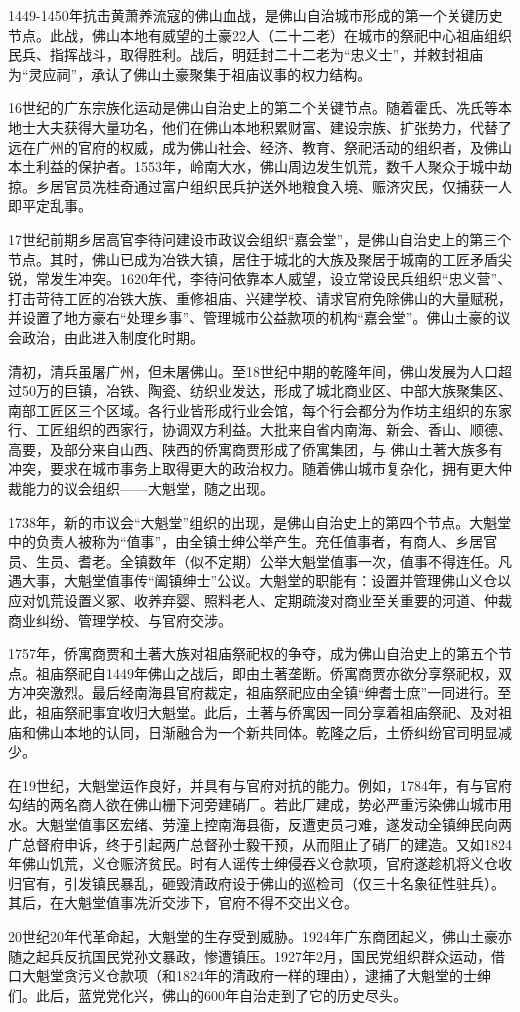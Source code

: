 1449-1450年抗击黄萧养流寇的佛山血战，是佛山自治城市形成的第一个关键历史节点。此战，佛山本地有威望的土豪22人（二十二老）在城市的祭祀中心祖庙组织民兵、指挥战斗，取得胜利。战后，明廷封二十二老为“忠义士”，并敕封祖庙为“灵应祠”，承认了佛山土豪聚集于祖庙议事的权力结构。

16世纪的广东宗族化运动是佛山自治史上的第二个关键节点。随着霍氏、冼氏等本地士大夫获得大量功名，他们在佛山本地积累财富、建设宗族、扩张势力，代替了远在广州的官府的权威，成为佛山社会、经济、教育、祭祀活动的组织者，及佛山本土利益的保护者。1553年，岭南大水，佛山周边发生饥荒，数千人聚众于城中劫掠。乡居官员冼桂奇通过富户组织民兵护送外地粮食入境、赈济灾民，仅捕获一人即平定乱事。

17世纪前期乡居高官李待问建设市政议会组织“嘉会堂”，是佛山自治史上的第三个节点。其时，佛山已成为冶铁大镇，居住于城北的大族及聚居于城南的工匠矛盾尖锐，常发生冲突。1620年代，李待问依靠本人威望，设立常设民兵组织“忠义营”、打击苛待工匠的冶铁大族、重修祖庙、兴建学校、请求官府免除佛山的大量赋税，并设置了地方豪右“处理乡事”、管理城市公益款项的机构“嘉会堂”。佛山土豪的议会政治，由此进入制度化时期。

清初，清兵虽屠广州，但未屠佛山。至18世纪中期的乾隆年间，佛山发展为人口超过50万的巨镇，冶铁、陶瓷、纺织业发达，形成了城北商业区、中部大族聚集区、南部工匠区三个区域。各行业皆形成行业会馆，每个行会都分为作坊主组织的东家行、工匠组织的西家行，协调双方利益。大批来自省内南海、新会、香山、顺德、高要，及部分来自山西、陕西的侨寓商贾形成了侨寓集团，与 佛山土著大族多有冲突，要求在城市事务上取得更大的政治权力。随着佛山城市复杂化，拥有更大仲裁能力的议会组织——大魁堂，随之出现。

1738年，新的市议会“大魁堂”组织的出现，是佛山自治史上的第四个节点。大魁堂中的负责人被称为“值事”，由全镇士绅公举产生。充任值事者，有商人、乡居官员、生员、耆老。全镇数年（似不定期）公举大魁堂值事一次，值事不得连任。凡遇大事，大魁堂值事传“阖镇绅士”公议。大魁堂的职能有：设置并管理佛山义仓以应对饥荒设置义冢、收养弃婴、照料老人、定期疏浚对商业至关重要的河道、仲裁商业纠纷、管理学校、与官府交涉。

1757年，侨寓商贾和土著大族对祖庙祭祀权的争夺，成为佛山自治史上的第五个节点。祖庙祭祀自1449年佛山之战后，即由土著垄断。侨寓商贾亦欲分享祭祀权，双方冲突激烈。最后经南海县官府裁定，祖庙祭祀应由全镇“绅耆士庶”一同进行。至此，祖庙祭祀事宜收归大魁堂。此后，土著与侨寓因一同分享着祖庙祭祀、及对祖庙和佛山本地的认同，日渐融合为一个新共同体。乾隆之后，土侨纠纷官司明显减少。

在19世纪，大魁堂运作良好，并具有与官府对抗的能力。例如，1784年，有与官府勾结的两名商人欲在佛山栅下河旁建硝厂。若此厂建成，势必严重污染佛山城市用水。大魁堂值事区宏绪、劳潼上控南海县衙，反遭吏员刁难，遂发动全镇绅民向两广总督府申诉，终于引起两广总督孙士毅干预，从而阻止了硝厂的建造。又如1824年佛山饥荒，义仓赈济贫民。时有人谣传士绅侵吞义仓款项，官府遂趁机将义仓收归官有，引发镇民暴乱，砸毁清政府设于佛山的巡检司（仅三十名象征性驻兵）。其后，在大魁堂值事冼沂交涉下，官府不得不交出义仓。

20世纪20年代革命起，大魁堂的生存受到威胁。1924年广东商团起义，佛山土豪亦随之起兵反抗国民党孙文暴政，惨遭镇压。1927年2月，国民党组织群众运动，借口大魁堂贪污义仓款项（和1824年的清政府一样的理由），逮捕了大魁堂的士绅们。此后，蓝党党化兴，佛山的600年自治走到了它的历史尽头。
